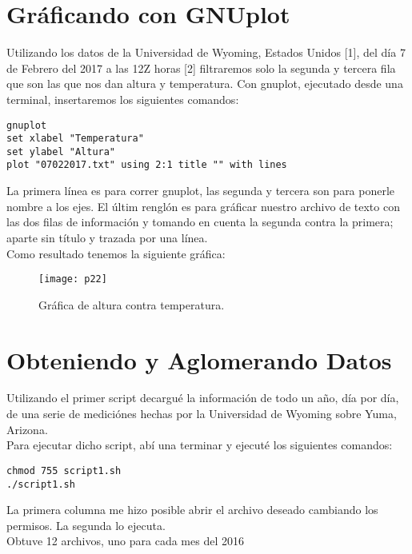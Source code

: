 \documentclass[12pt,a4paper]{article}
\begin{document}
\newpage

\section{Gráficando con GNUplot}

Utilizando los datos de la Universidad de Wyoming, Estados Unidos [1], del día 7 de Febrero del 2017 a las 12Z horas [2] filtraremos solo la segunda y tercera fila que son las que nos dan altura y temperatura. Con gnuplot, ejecutado desde una terminal, insertaremos los siguientes comandos: \\

\begin{verbatim}
gnuplot
set xlabel "Temperatura"
set ylabel "Altura"
plot "07022017.txt" using 2:1 title "" with lines
\end{verbatim}
La primera línea es para correr gnuplot, las segunda y tercera son para ponerle nombre a los ejes. El últim renglón es para gráficar nuestro archivo de texto con las dos filas de información y tomando en cuenta la segunda contra la primera; aparte sin título y trazada por una línea. \\
Como resultado tenemos la siguiente gráfica:  \\

\begin{figure}[h]
\centering
\texttt{[image: p22]}
\caption{Gráfica de altura contra temperatura. \label{overflow}}
\end{figure}

\newpage

\section{Obteniendo y Aglomerando Datos}
Utilizando el primer script decargué la información de todo un año, día por día, de una serie de mediciónes hechas por la Universidad de Wyoming sobre Yuma, Arizona. \\
Para ejecutar dicho script, abí una terminar y ejecuté los siguientes comandos: \\
\begin{verbatim}
chmod 755 script1.sh
./script1.sh
\end{verbatim}
La primera columna me hizo posible abrir el archivo deseado cambiando los permisos. La segunda lo ejecuta. \\

Obtuve 12 archivos, uno para cada mes del 2016 \\
\end{document}
